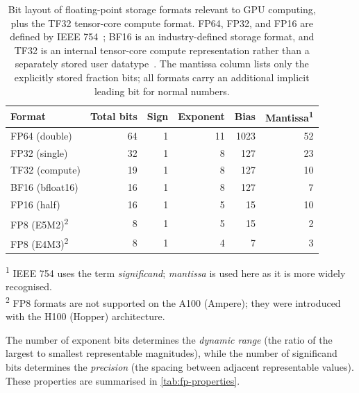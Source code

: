 \begin{table}[H]
\centering
\caption{Bit layout of floating-point storage formats relevant to GPU computing, plus the TF32 tensor-core compute format. FP64, FP32, and FP16 are defined by IEEE 754~\cite{ieee754-2019}; BF16 is an industry-defined storage format, and TF32 is an internal tensor-core compute representation rather than a separately stored user datatype~\cite{nvidia-tf32,nvidia-ampere-in-depth}. The mantissa column lists only the explicitly stored fraction bits; all formats carry an additional implicit leading bit for normal numbers.}
\label{tab:fp-bit-layout}
\begin{tabularx}{\textwidth}{l r r r r r}
\toprule
Format & Total bits & Sign & Exponent & Bias & Mantissa\textsuperscript{1} \\
\midrule
FP64 (double) & 64 & 1 & 11 & 1023 & 52 \\
FP32 (single) & 32 & 1 & 8  & 127  & 23 \\
TF32 (compute) & 19 & 1 & 8  & 127  & 10 \\
BF16 (bfloat16)& 16 & 1 & 8  & 127  & 7  \\
FP16 (half)    & 16 & 1 & 5  & 15   & 10 \\
FP8 (E5M2)\textsuperscript{2} & 8 & 1 & 5 & 15 & 2 \\
FP8 (E4M3)\textsuperscript{2} & 8 & 1 & 4 & 7  & 3 \\
\bottomrule
\end{tabularx}
\vspace{0.35em}
\begin{minipage}{\textwidth}
\footnotesize
\textsuperscript{1} IEEE 754 uses the term \emph{significand}; \emph{mantissa}
is used here as it is more widely recognised.\\
\textsuperscript{2} FP8 formats are not supported on the A100 (Ampere); they
were introduced with the H100 (Hopper) architecture.
\end{minipage}
\end{table}

The number of exponent bits determines the \emph{dynamic range} (the ratio of the largest to smallest representable magnitudes), while the number of significand bits determines the \emph{precision} (the spacing between adjacent representable values). These properties are summarised in \cref{tab:fp-properties}.

